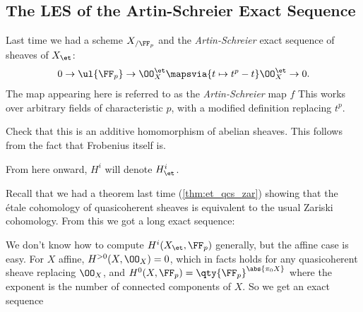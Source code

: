 \hypertarget{the-les-of-the-artin-schreier-exact-sequence}{%
\subsection{The LES of the Artin-Schreier Exact
Sequence}\label{the-les-of-the-artin-schreier-exact-sequence}}

Last time we had a scheme \(X_{/\FF_p}\) and the \emph{Artin-Schreier}
exact sequence of sheaves of \(X_\et\):
\begin{align*}  
0\to \ul{\FF_p} \to \OO_X^\et \mapsvia{t\mapsto t^p - t} \OO_X^\et \to 0
.\end{align*} The map appearing here is referred to as the
\emph{Artin-Schreier} map \(f\) This works over arbitrary fields of
characteristic \(p\), with a modified definition replacing \(t^p\).

\begin{exercise}[?]

Check that this is an additive homomorphism of abelian sheaves. This
follows from the fact that Frobenius itself is.

\end{exercise}

\begin{remark}

From here onward, \(H^i\) will denote \(H^i_\et\).

\end{remark}

Recall that we had a theorem last time (\cref{thm:et_qcs_zar}) showing
that the étale cohomology of quasicoherent sheaves is equivalent to the
usual Zariski cohomology. From this we got a long exact sequence:

\begin{center}
\end{center}

We don't know how to compute \(H^i(X_\et, \FF_p)\) generally, but the
affine case is easy. For \(X\) affine, \(H^{>0}(X, \OO_X) = 0\), which
in facts holds for any quasicoherent sheave replacing \(\OO_X\), and
\(H^0(X, \FF_p) = \qty{\FF_p}^{\abs {\pi_0 X} }\) where the exponent is
the number of connected components of \(X\). So we get an exact sequence

